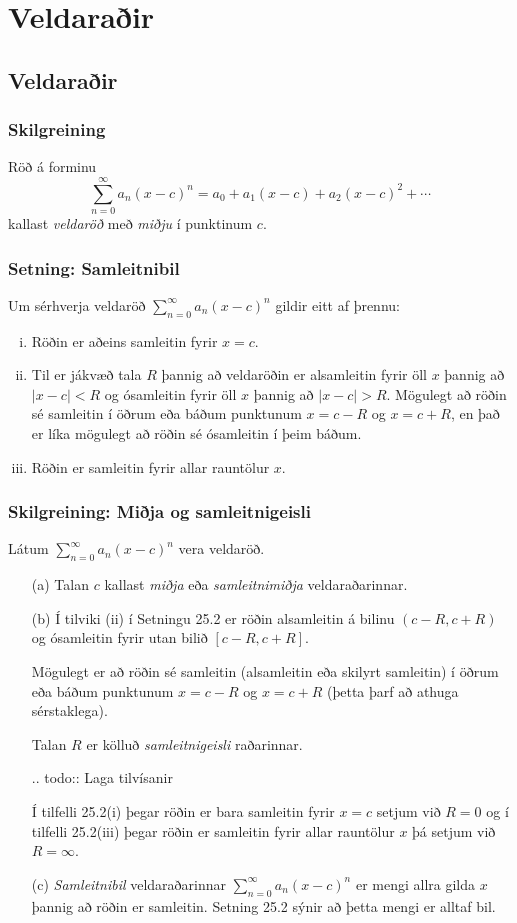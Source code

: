 \documentclass[icelandic,a4paper,12pt]{article}
\date{29. ágúst 2015}
\begin{document}
\setcounter{tocdepth}{2}
\tableofcontents

\section{Veldaraðir}

\subsection{Veldaraðir}
\subsubsection{Skilgreining}  
Röð á forminu 
$$\sum_{n=0}^\infty a_n(x-c)^n=a_0+a_1(x-c)+a_2(x-c)^2+\cdots$$
kallast \emph{veldaröð} með \emph{miðju} í punktinum $c$.

\subsubsection{Setning: Samleitnibil} 
Um sérhverja veldaröð $\sum_{n=0}^\infty a_n(x-c)^n$ gildir eitt af þrennu:
\begin{enumerate}[(i)]
\item Röðin er aðeins samleitin fyrir $x=c$.
\item Til er jákvæð tala $R$ þannig að veldaröðin er alsamleitin
fyrir öll $x$ þannig að $|x-c|<R$ og ósamleitin fyrir öll $x$
þannig að $|x-c|>R$.  Mögulegt að röðin sé samleitin í öðrum eða
báðum punktunum $x=c-R$ og $x=c+R$, en það er líka mögulegt að röðin
sé ósamleitin í þeim báðum.
\item  Röðin er samleitin fyrir allar rauntölur $x$.
\end{enumerate}

\subsubsection{Skilgreining: Miðja og samleitnigeisli}
Látum $\sum_{n=0}^\infty a_n(x-c)^n$ vera veldaröð.
\begin{enumerate}[(i)]
\item[(a)]  Talan $c$ kallast \emph{miðja} eða \emph{samleitnimiðja} veldaraðarinnar. 
\item[(b)]  Í tilviki (ii) í Setningu 25.2 er röðin alsamleitin á bilinu $(c-R, c+R)$ 
og ósamleitin fyrir utan bilið $[c-R, c+R]$.
  
Mögulegt er að röðin sé samleitin (alsamleitin eða skilyrt samleitin) í öðrum eða 
báðum punktunum $x=c-R$ og $x=c+R$ (þetta þarf að athuga sérstaklega).  

Talan $R$ er kölluð \emph{samleitnigeisli} raðarinnar.  

.. todo::
  Laga tilvísanir

Í tilfelli 25.2(i) þegar röðin er bara samleitin fyrir $x=c$ setjum við $R=0$  
og í tilfelli 25.2(iii) þegar röðin er samleitin fyrir allar rauntölur $x$ þá 
setjum við $R=\infty$.
\item[(c)]  \emph{Samleitnibil} veldaraðarinnar $\sum_{n=0}^\infty a_n(x-c)^n$ 
er mengi allra gilda $x$ þannig að röðin er samleitin. Setning 25.2 sýnir að 
þetta mengi er alltaf bil.
\end{enumerate}
\end{document}
